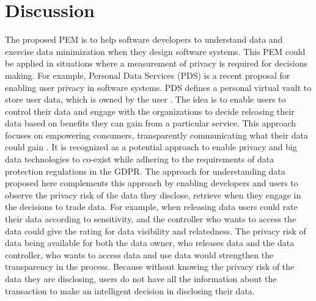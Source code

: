 \documentclass{sigchi}
\begin{document}
\section {Discussion}

The proposed PEM is to help software developers to understand data and exercise data minimization when they design software systems. This PEM could be applied in situations where a measurement of privacy is required for decisions making. For example, Personal Data Services (PDS) is a recent proposal for enabling user privacy in software systems. PDS defines a personal virtual vault to store user data, which is owned by the user \cite {rubinstein2012big, tene2012big}. The idea is to enable users to control their data and engage with the organizations to decide releasing their data based on benefits they can gain from a particular service. This approach focuses on empowering consumers, transparently communicating what their data could gain \cite {rubinstein2012big}. It is recognized as a potential approach to enable privacy and big data technologies to co-exist while adhering to the requirements of data protection regulations in the GDPR. The approach for understanding data proposed here complements this approach by enabling developers and users to observe the privacy risk of the data they disclose, retrieve when they engage in the decisions to trade data. For example, when releasing data users could rate their data according to sensitivity, and the controller who wants to access the data could give the rating for data visibility and relatedness. The privacy risk of data being available for both the data owner, who releases data and the data controller, who wants to access data and use data would strengthen the transparency in the process. Because without knowing the privacy risk of the data they are disclosing, users do not have all the information about the transaction to make an intelligent decision in disclosing their data.
\end{document}
